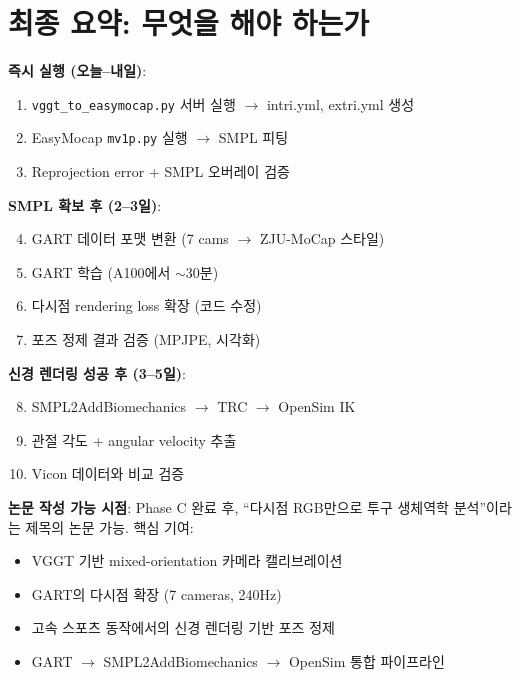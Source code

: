 \documentclass[11pt, a4paper]{report}
\begin{document}
\chapter{최종 요약: 무엇을 해야 하는가}

\begin{summary}
\textbf{즉시 실행 (오늘--내일)}:
\begin{enumerate}[leftmargin=*]
  \item \texttt{vggt\_to\_easymocap.py} 서버 실행 $\rightarrow$ intri.yml, extri.yml 생성
  \item EasyMocap \texttt{mv1p.py} 실행 $\rightarrow$ SMPL 피팅
  \item Reprojection error + SMPL 오버레이 검증
\end{enumerate}

\textbf{SMPL 확보 후 (2--3일)}:
\begin{enumerate}[leftmargin=*]
  \setcounter{enumi}{3}
  \item GART 데이터 포맷 변환 (7 cams $\rightarrow$ ZJU-MoCap 스타일)
  \item GART 학습 (A100에서 $\sim$30분)
  \item 다시점 rendering loss 확장 (코드 수정)
  \item 포즈 정제 결과 검증 (MPJPE, 시각화)
\end{enumerate}

\textbf{신경 렌더링 성공 후 (3--5일)}:
\begin{enumerate}[leftmargin=*]
  \setcounter{enumi}{7}
  \item SMPL2AddBiomechanics $\rightarrow$ TRC $\rightarrow$ OpenSim IK
  \item 관절 각도 + angular velocity 추출
  \item Vicon 데이터와 비교 검증
\end{enumerate}

\textbf{논문 작성 가능 시점}: Phase C 완료 후, ``다시점 RGB만으로 투구 생체역학 분석''이라는 제목의 논문 가능. 핵심 기여:
\begin{itemize}[leftmargin=*]
  \item VGGT 기반 mixed-orientation 카메라 캘리브레이션
  \item GART의 다시점 확장 (7 cameras, 240Hz)
  \item 고속 스포츠 동작에서의 신경 렌더링 기반 포즈 정제
  \item GART $\rightarrow$ SMPL2AddBiomechanics $\rightarrow$ OpenSim 통합 파이프라인
\end{itemize}
\end{summary}
\end{document}
